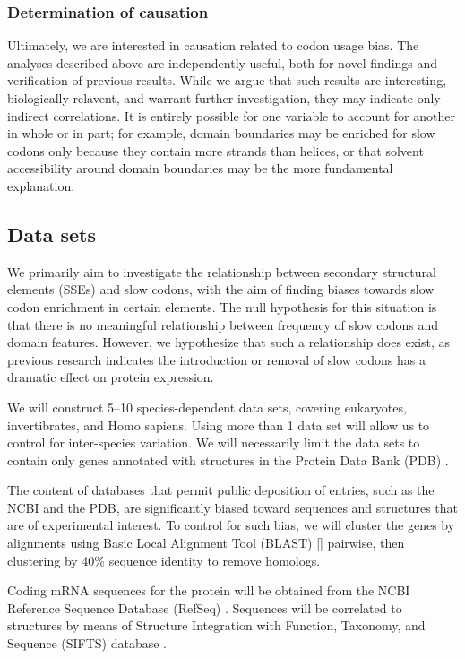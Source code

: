 \documentclass[11pt]{nih}
\begin{document}
\subsubsection{Determination of causation}
Ultimately, we are interested in causation related to codon usage bias. The analyses described above are independently useful, both for novel findings and verification of previous results. While we argue that such results are interesting, biologically relavent, and warrant further investigation, they may indicate only indirect correlations. It is entirely possible for one variable to account for another in whole or in part; for example, domain boundaries may be enriched for slow codons only because they contain more strands than helices, or that solvent accessibility around domain boundaries may be the more fundamental explanation.


\subsection{Data sets}

We primarily aim to investigate the relationship between secondary structural elements (SSEs) and slow codons, with the aim of finding biases towards slow codon enrichment in certain elements. The null hypothesis for this situation is that there is no meaningful relationship between frequency of slow codons and domain features. However, we hypothesize that such a relationship does exist, as previous research indicates the introduction or removal of slow codons has a dramatic effect on protein expression.

We will construct 5--10 species-dependent data sets, covering eukaryotes, invertibrates, and Homo sapiens. Using more than 1 data set will allow us to control for inter-species variation. We will necessarily limit the data sets to contain only genes annotated with structures in the Protein Data Bank (PDB) \citep{pdb}.

The content of databases that permit public deposition of entries, such as the NCBI and the PDB, are significantly biased toward sequences and structures that are of experimental interest. To control for such bias, we will cluster the genes by alignments using Basic Local Alignment Tool (BLAST) [] pairwise, then clustering by 40\% sequence identity to remove homologs.

Coding mRNA sequences for the protein will be obtained from the NCBI Reference Sequence Database (RefSeq) \citep{refseq}. Sequences will be correlated to structures by means of Structure Integration with Function, Taxonomy, and Sequence (SIFTS) database \citep{sifts}.
\end{document}
